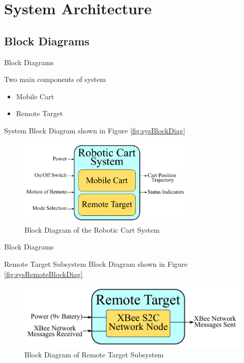 \documentclass{beamer}
\begin{document}

\section{System Architecture}

\subsection{Block Diagrams}
\begin{frame}{Block Diagrams}
  \begin{block}{}
    Two main components of system
    \begin{itemize}
      \item Mobile Cart
      \item Remote Target
    \end{itemize}
    System Block Diagram shown in Figure \autoref{fig:sysBlockDiag}
  \end{block}
  \begin{figure}[b]
    \centering
    \includegraphics[width=0.75\textwidth]{figs/system_block_diagram_2}
    \caption{Block Diagram of the Robotic Cart System}
    \label{fig:sysBlockDiag}
  \end{figure}
\end{frame}


\begin{frame}{Block Diagrams}
  \begin{block}{}
    Remote Target Subsystem Block Diagram shown in Figure \autoref{fig:sysRemoteBlockDiag}
  \end{block}
  \begin{figure}[b]
    \centering
    \includegraphics[width=\textwidth]{figs/remote_target_block_diagram}
    \caption{Block Diagram of Remote Target Subsystem}
    \label{fig:sysRemoteBlockDiag}
  \end{figure}
\end{frame}
\end{document}
